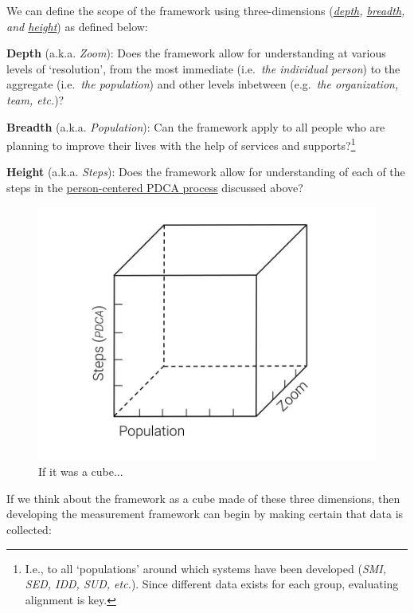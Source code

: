 \documentclass[
]{book}
\begin{document}
We can define the scope of the framework using three-dimensions (\emph{\protect\hyperlink{zoom}{depth}, \protect\hyperlink{pop}{breadth}, and \protect\hyperlink{steps}{height}}) as defined below:

\textbf{Depth} (a.k.a. \emph{Zoom}): Does the framework allow for understanding at various levels of `resolution', from the most immediate (i.e.~\emph{the individual person}) to the aggregate (i.e.~\emph{the population}) and other levels inbetween (e.g.~\emph{the organization, team, etc.})?

\textbf{Breadth} (a.k.a. \emph{Population}): Can the framework apply to all people who are planning to improve their lives with the help of services and supports?\footnote{I.e., to all `populations' around which systems have been developed (\emph{SMI, SED, IDD, SUD, etc.}). Since different data exists for each group, evaluating alignment is key.}

\textbf{Height} (a.k.a. \emph{Steps}): Does the framework allow for understanding of each of the steps in the \protect\hyperlink{pcpdca}{person-centered PDCA process} discussed above?

\begin{figure}
\includegraphics[width=24in]{_bookdown_files/img/QoL Framework Cube} \caption{If it was a cube...}\label{fig:unnamed-chunk-15}
\end{figure}

If we think about the framework as a cube made of these three dimensions, then developing the measurement framework can begin by making certain that data is collected:
\end{document}
